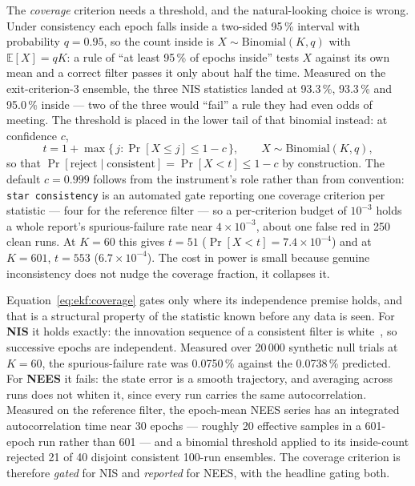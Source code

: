 The \emph{coverage} criterion needs a threshold, and the natural-looking
choice is wrong. Under consistency each epoch falls inside a two-sided
95\,\% interval with probability $q = 0.95$, so the count inside is
$X \sim \mathrm{Binomial}(K, q)$ with $\mathbb{E}[X] = qK$: a rule of
``at least 95\,\% of epochs inside'' tests $X$ against its own mean and
a correct filter passes it only about half the time. Measured on the
exit-criterion-3 ensemble, the three NIS statistics landed at
93.3\,\%, 93.3\,\% and 95.0\,\% inside --- two of the three would
``fail'' a rule they had even odds of meeting. The threshold is placed
in the lower tail of that binomial instead: at confidence $c$,
\begin{equation}
  \boxed{\;
  t = 1 + \max\{\, j : \Pr[X \le j] \le 1 - c \,\},
  \qquad X \sim \mathrm{Binomial}(K, q),
  \;}
  \label{eq:ekf:coverage}
\end{equation}
so that $\Pr[\text{reject} \mid \text{consistent}] = \Pr[X < t] \le
1 - c$ by construction. The default $c = 0.999$ follows from the
instrument's role rather than from convention: \texttt{star
consistency} is an automated gate reporting one coverage criterion per
statistic --- four for the reference filter --- so a per-criterion
budget of $10^{-3}$ holds a whole report's spurious-failure rate near
$4 \times 10^{-3}$, about one false red in 250 clean runs. At $K = 60$
this gives $t = 51$ ($\Pr[X < t] = 7.4 \times 10^{-4}$) and at
$K = 601$, $t = 553$ ($6.7 \times 10^{-4}$). The cost in power is small
because genuine inconsistency does not nudge the coverage fraction, it
collapses it.

Equation~\eqref{eq:ekf:coverage} gates only where its independence
premise holds, and that is a structural property of the statistic known
before any data is seen. For \textbf{NIS} it holds exactly: the
innovation sequence of a consistent filter is white~\cite{barshalom2001},
so successive epochs are independent. Measured over 20\,000 synthetic
null trials at $K = 60$, the spurious-failure rate was 0.0750\,\%
against the 0.0738\,\% predicted. For \textbf{NEES} it fails: the state
error is a smooth trajectory, and averaging across runs does not whiten
it, since every run carries the same autocorrelation. Measured on the
reference filter, the epoch-mean NEES series has an integrated
autocorrelation time near 30 epochs --- roughly 20 effective samples in
a 601-epoch run rather than 601 --- and a binomial threshold applied to
its inside-count rejected 21 of 40 disjoint consistent 100-run
ensembles. The coverage criterion is therefore \emph{gated} for NIS and
\emph{reported} for NEES, with the headline gating both.

